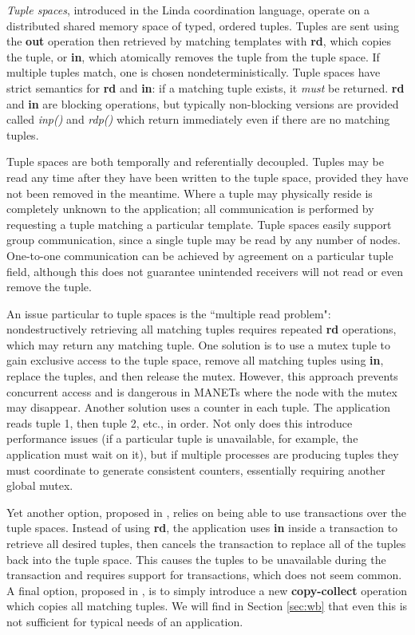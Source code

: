 \textit{Tuple spaces}, introduced in the Linda\cite{linda} coordination language, operate on a distributed shared memory space of typed, ordered tuples. Tuples are sent using the \textbf{out} operation then retrieved by matching templates with \textbf{rd}, which copies the tuple, or \textbf{in}, which atomically removes the tuple from the tuple space. If multiple tuples match, one is chosen nondeterministically. Tuple spaces have strict semantics for \textbf{rd} and \textbf{in}: if a matching tuple exists, it \textit{must} be returned. \textbf{rd} and \textbf{in} are blocking operations, but typically non-blocking versions are provided called \textit{inp()} and \textit{rdp()} which return immediately even if there are no matching tuples.

Tuple spaces are both temporally and referentially decoupled. Tuples may be read any time after they have been written to the tuple space, provided they have not been removed in the meantime. Where a tuple may physically reside is completely unknown to the application; all communication is performed by requesting a tuple matching a particular template. Tuple spaces easily support group communication, since a single tuple may be read by any number of nodes. One-to-one communication can be achieved by agreement on a particular tuple field, although this does not guarantee unintended receivers will not read or even remove the tuple.

An issue particular to tuple spaces is the ``multiple read problem": nondestructively retrieving all matching tuples requires repeated \textbf{rd} operations, which may return any matching tuple\cite{mrdp}. One solution is to use a mutex tuple to gain exclusive access to the tuple space, remove all matching tuples using \textbf{in}, replace the tuples, and then release the mutex. However, this approach prevents concurrent access and is dangerous in MANETs where the node with the mutex may disappear. Another solution uses a counter in each tuple. The application reads tuple 1, then tuple 2, etc., in order. Not only does this introduce performance issues (if a particular tuple is unavailable, for example, the application must wait on it), but if multiple processes are producing tuples they must coordinate to generate consistent counters, essentially requiring another global mutex.

Yet another option, proposed in \cite{edwards2001jini}, relies on being able to use transactions over the tuple spaces. Instead of using \textbf{rd}, the application uses \textbf{in} inside a transaction to retrieve all desired tuples, then cancels the transaction to replace all of the tuples back into the tuple space. This causes the tuples to be unavailable during the transaction and requires support for transactions, which does not seem common. A final option, proposed in \cite{mrdp}, is to simply introduce a new \textbf{copy-collect} operation which copies all matching tuples. We will find in Section \ref{sec:wb} that even this is not sufficient for typical needs of an application.

